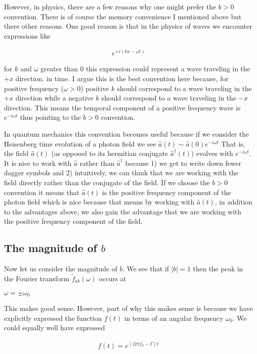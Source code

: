 \documentclass[12pt]{article}
\begin{document}
However, in physics, there are a few reasons why one might prefer the $b>0$ convention. There is of course the memory convenience I mentioned above but there other reasons. One good reason is that in the physics of waves we encounter expressions like

\begin{align}
e^{+i(kx - \omega t)}
\end{align}

for $k$ and $\omega$ greater than 0 this expression could represent a wave traveling in the $+x$ direction. in time. I argue this is the best convention here because, for positive frequency ($\omega >0$) positive $k$ should correspond to a wave traveling in the $+x$ direction while a negative $k$ should correspond to a wave traveling in the $-x$ direction. This means the temporal component of a positive frequency wave is $e^{-i\omega t}$ thus pointing to the $b>0$ convention.

In quantum mechanics this convention becomes useful because if we consider the Heisenberg time evolution of a photon field we see $\hat{a}(t) \sim \hat{a}(0)e^{-i\omega t}$ That is, the field $\hat{a}(t)$ (as opposed to its hermitian conjugate $\hat{a}^{\dag}(t)$) evolves with $e^{-i\omega t}$. It is nice to work with $\hat{a}$ rather than $\hat{a}^{\dag}$ because 1) we get to write down fewer dagger symbols and 2) intuitively, we can think that we are working with the field directly rather than the conjugate of the field.
If we choose the $b>0$ convention it means that $\hat{a}(t)$ is the positive frequency component of the photon field which is nice because that means by working with $\hat{a}(t)$, in addition to the advantages above, we also gain the advantage that we are working with the positive frequency component of the field.

\subsection{The magnitude of $b$}
Now let us consider the magnitude of $b$. We see that if $|b| = 1$ then the peak in the Fourier transform $\tilde{f}_{ab}(\omega)$ occurs at 

$\omega = \pm \omega_0$

This makes good sense. However, part of why this makes sense is because we have explicitly expressed the function $f(t)$ in terms of an angular frequency $\omega_0$. We could equally well have expressed

\begin{align}
f(t) = e^{(i2\pi f_0 - \Gamma)t}
\end{align}
\end{document}
